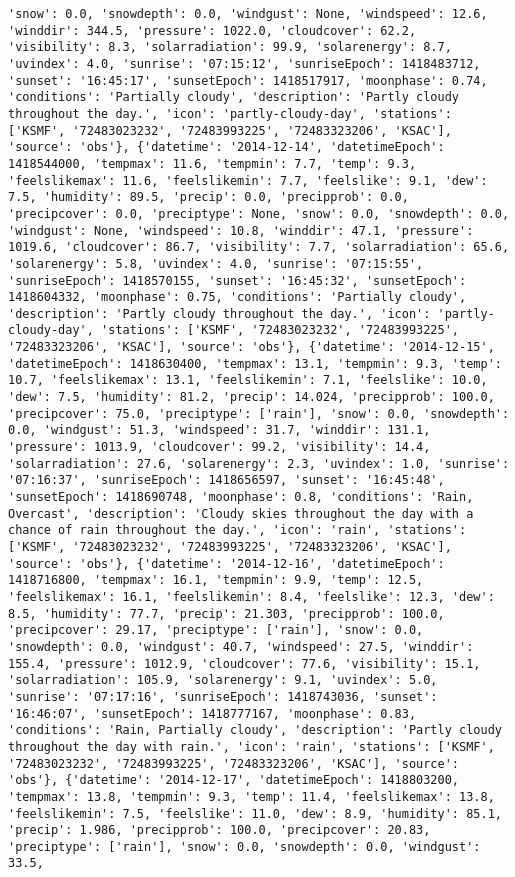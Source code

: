 \documentclass[
  letterpaper,
  DIV=11,
  numbers=noendperiod]{scrartcl}
\begin{document}
\begin{verbatim}
'snow': 0.0, 'snowdepth': 0.0, 'windgust': None, 'windspeed': 12.6, 'winddir': 344.5, 'pressure': 1022.0, 'cloudcover': 62.2, 'visibility': 8.3, 'solarradiation': 99.9, 'solarenergy': 8.7, 'uvindex': 4.0, 'sunrise': '07:15:12', 'sunriseEpoch': 1418483712, 'sunset': '16:45:17', 'sunsetEpoch': 1418517917, 'moonphase': 0.74, 'conditions': 'Partially cloudy', 'description': 'Partly cloudy throughout the day.', 'icon': 'partly-cloudy-day', 'stations': ['KSMF', '72483023232', '72483993225', '72483323206', 'KSAC'], 'source': 'obs'}, {'datetime': '2014-12-14', 'datetimeEpoch': 1418544000, 'tempmax': 11.6, 'tempmin': 7.7, 'temp': 9.3, 'feelslikemax': 11.6, 'feelslikemin': 7.7, 'feelslike': 9.1, 'dew': 7.5, 'humidity': 89.5, 'precip': 0.0, 'precipprob': 0.0, 'precipcover': 0.0, 'preciptype': None, 'snow': 0.0, 'snowdepth': 0.0, 'windgust': None, 'windspeed': 10.8, 'winddir': 47.1, 'pressure': 1019.6, 'cloudcover': 86.7, 'visibility': 7.7, 'solarradiation': 65.6, 'solarenergy': 5.8, 'uvindex': 4.0, 'sunrise': '07:15:55', 'sunriseEpoch': 1418570155, 'sunset': '16:45:32', 'sunsetEpoch': 1418604332, 'moonphase': 0.75, 'conditions': 'Partially cloudy', 'description': 'Partly cloudy throughout the day.', 'icon': 'partly-cloudy-day', 'stations': ['KSMF', '72483023232', '72483993225', '72483323206', 'KSAC'], 'source': 'obs'}, {'datetime': '2014-12-15', 'datetimeEpoch': 1418630400, 'tempmax': 13.1, 'tempmin': 9.3, 'temp': 10.7, 'feelslikemax': 13.1, 'feelslikemin': 7.1, 'feelslike': 10.0, 'dew': 7.5, 'humidity': 81.2, 'precip': 14.024, 'precipprob': 100.0, 'precipcover': 75.0, 'preciptype': ['rain'], 'snow': 0.0, 'snowdepth': 0.0, 'windgust': 51.3, 'windspeed': 31.7, 'winddir': 131.1, 'pressure': 1013.9, 'cloudcover': 99.2, 'visibility': 14.4, 'solarradiation': 27.6, 'solarenergy': 2.3, 'uvindex': 1.0, 'sunrise': '07:16:37', 'sunriseEpoch': 1418656597, 'sunset': '16:45:48', 'sunsetEpoch': 1418690748, 'moonphase': 0.8, 'conditions': 'Rain, Overcast', 'description': 'Cloudy skies throughout the day with a chance of rain throughout the day.', 'icon': 'rain', 'stations': ['KSMF', '72483023232', '72483993225', '72483323206', 'KSAC'], 'source': 'obs'}, {'datetime': '2014-12-16', 'datetimeEpoch': 1418716800, 'tempmax': 16.1, 'tempmin': 9.9, 'temp': 12.5, 'feelslikemax': 16.1, 'feelslikemin': 8.4, 'feelslike': 12.3, 'dew': 8.5, 'humidity': 77.7, 'precip': 21.303, 'precipprob': 100.0, 'precipcover': 29.17, 'preciptype': ['rain'], 'snow': 0.0, 'snowdepth': 0.0, 'windgust': 40.7, 'windspeed': 27.5, 'winddir': 155.4, 'pressure': 1012.9, 'cloudcover': 77.6, 'visibility': 15.1, 'solarradiation': 105.9, 'solarenergy': 9.1, 'uvindex': 5.0, 'sunrise': '07:17:16', 'sunriseEpoch': 1418743036, 'sunset': '16:46:07', 'sunsetEpoch': 1418777167, 'moonphase': 0.83, 'conditions': 'Rain, Partially cloudy', 'description': 'Partly cloudy throughout the day with rain.', 'icon': 'rain', 'stations': ['KSMF', '72483023232', '72483993225', '72483323206', 'KSAC'], 'source': 'obs'}, {'datetime': '2014-12-17', 'datetimeEpoch': 1418803200, 'tempmax': 13.8, 'tempmin': 9.3, 'temp': 11.4, 'feelslikemax': 13.8, 'feelslikemin': 7.5, 'feelslike': 11.0, 'dew': 8.9, 'humidity': 85.1, 'precip': 1.986, 'precipprob': 100.0, 'precipcover': 20.83, 'preciptype': ['rain'], 'snow': 0.0, 'snowdepth': 0.0, 'windgust': 33.5, 
\end{verbatim}
\end{document}
